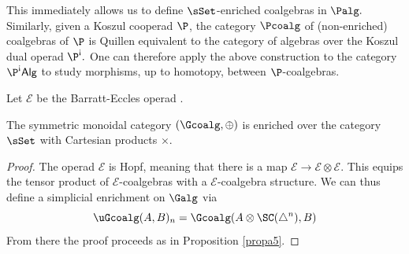\documentclass{tac}
\def\E{\mathcal E}
\newcommand{\antishriek}{\text{\raisebox{\depth}{\textexclamdown}}}
\begin{document}
This immediately allows us to define $\sSet$-enriched coalgebras in $\Palg.$ Similarly, given a Koszul cooperad $\P$, the category $\Pcoalg$ of (non-enriched) coalgebras of $\P$ is Quillen equivalent to the category of algebras over the Koszul dual operad $\P^\antishriek.$ One can therefore apply the above construction to the category $\P^\antishriek\mathsf{Alg}$ to study morphisms, up to homotopy, between $\P$-coalgebras.

Let $\E$ be the Barratt-Eccles operad \cite{berger04}.
\begin{proposition}
    The symmetric monoidal category $(\Gcoalg, \oplus)$ is enriched over the category $\sSet$ with Cartesian products $\times$.
\end{proposition}
\begin{proof}
    The operad $\E$ is Hopf, meaning that there is a map $\E \to \E\otimes \E.$ This equips the tensor product of $\E$-coalgebras with a $\E$-coalgebra structure. We can thus define a simplicial enrichment on  $\Galg$ via 
    $$
    \uGcoalg(A, B)_n = \Gcoalg(A\otimes \SC(\triangle^n), B)
    $$
    From there the proof proceeds as in Proposition \ref{propa5}.
\end{proof}


\end{document}
